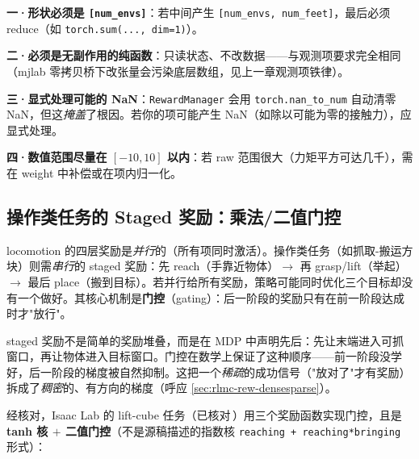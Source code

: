 \begin{pitfall}[编写奖励项的四条铁律]
\textbf{一·形状必须是 \texttt{[num\_envs]}}：若中间产生 \verb|[num_envs, num_feet]|，最后必须 reduce（如 \verb|torch.sum(..., dim=1)|）。

\textbf{二·必须是无副作用的纯函数}：只读状态、不改数据——与观测项要求完全相同（mjlab 零拷贝桥下改张量会污染底层数组，见上一章观测项铁律）。

\textbf{三·显式处理可能的 NaN}：\verb|RewardManager| 会用 \verb|torch.nan_to_num| 自动清零 NaN，但这\emph{掩盖}了根因。若你的项可能产生 NaN（如除以可能为零的接触力），应显式处理。

\textbf{四·数值范围尽量在 $[-10,10]$ 以内}：若 raw 范围很大（力矩平方可达几千），需在 weight 中补偿或在项内归一化。
\end{pitfall}

\subsection{操作类任务的 Staged 奖励：乘法/二值门控}
\label{sec:rlmc-rew-staged}

locomotion 的四层奖励是\emph{并行}的（所有项同时激活）。操作类任务（如抓取-搬运方块）则需\emph{串行}的 staged 奖励：先 reach（手靠近物体）$\to$ 再 grasp/lift（举起）$\to$ 最后 place（搬到目标）。若并行给所有奖励，策略可能同时优化三个目标却没有一个做好。其核心机制是\textbf{门控}（gating）：后一阶段的奖励只有在前一阶段达成时才"放行"。

\begin{insight}\label{ins:rlmc-rew-staged}
staged 奖励不是简单的奖励堆叠，而是在 MDP 中声明先后：先让末端进入可抓窗口，再让物体进入目标窗口。门控在数学上保证了这种顺序——前一阶段没学好，后一阶段的梯度被自然抑制。这把一个\emph{稀疏}的成功信号（"放对了"才有奖励）拆成了\emph{稠密}的、有方向的梯度（呼应 \cref{sec:rlmc-rew-densesparse}）。
\end{insight}

经核对，Isaac Lab 的 lift-cube 任务（已核对\,\cite{isaaclab2024}）用三个奖励函数实现门控，且是 \textbf{tanh 核 $+$ 二值门控}（不是源稿描述的指数核 \verb|reaching + reaching*bringing| 形式）：

